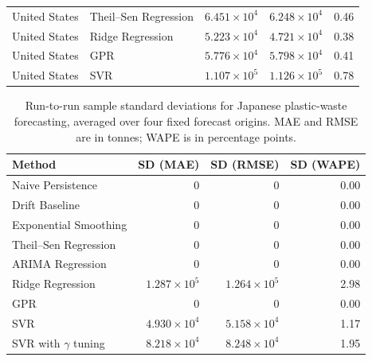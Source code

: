 \begin{table}[!ht]
\begin{tabular}{@{}llrrr@{}}
		United States & Theil--Sen Regression        & \(6.451 \times 10^{4}\) & \(6.248 \times 10^{4}\) & 0.46      \\
		United States & Ridge Regression             & \(5.223 \times 10^{4}\) & \(4.721 \times 10^{4}\) & 0.38      \\
		United States & GPR                          & \(5.776 \times 10^{4}\) & \(5.798 \times 10^{4}\) & 0.41      \\
		United States & SVR                          & \(1.107 \times 10^{5}\) & \(1.126 \times 10^{5}\) & 0.78      \\
		\bottomrule
	\end{tabular}
	\label{tab:dispersion_imputation}
\end{table}

\begin{table}[!ht]
	\centering
	\caption{Run-to-run sample standard deviations for Japanese plastic-waste forecasting, averaged over four fixed forecast origins. MAE and RMSE are in tonnes; WAPE is in percentage points.}
	\scriptsize
	\begin{tabular}{@{}lrrr@{}}
		\toprule
		Method                     & SD (MAE)                & SD (RMSE)               & SD (WAPE) \\
		\midrule
		Naive Persistence          & 0                       & 0                       & 0.00      \\
		Drift Baseline             & 0                       & 0                       & 0.00      \\
		Exponential Smoothing      & 0                       & 0                       & 0.00      \\
		Theil--Sen Regression      & 0                       & 0                       & 0.00      \\
		ARIMA Regression           & 0                       & 0                       & 0.00      \\
		Ridge Regression           & \(1.287 \times 10^{5}\) & \(1.264 \times 10^{5}\) & 2.98      \\
		GPR                        & 0                       & 0                       & 0.00      \\
		SVR                        & \(4.930 \times 10^{4}\) & \(5.158 \times 10^{4}\) & 1.17      \\
		SVR with \(\gamma\) tuning & \(8.218 \times 10^{4}\) & \(8.248 \times 10^{4}\) & 1.95      \\
		\bottomrule
	\end{tabular}
	\label{tab:dispersion_japan_forecasting}
\end{table}

